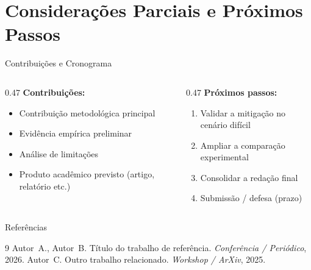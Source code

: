 \documentclass[aspectratio=169, 10pt, brazil]{beamer}
\begin{document}
\section{Considerações Parciais e Próximos Passos}

\begin{frame}{Contribuições e Cronograma}
  \begin{columns}[T]
    \begin{column}{0.47\textwidth}
      \textbf{Contribuições:}
      \begin{itemize}
        \item Contribuição metodológica principal
        \item Evidência empírica preliminar
        \item Análise de limitações
        \item Produto acadêmico previsto (artigo, relatório etc.)
      \end{itemize}
    \end{column}
    \begin{column}{0.47\textwidth}
      \textbf{Próximos passos:}
      \begin{enumerate}
        \item Validar a mitigação no cenário difícil
        \item Ampliar a comparação experimental
        \item Consolidar a redação final
        \item Submissão / defesa (prazo)
      \end{enumerate}
    \end{column}
  \end{columns}
\end{frame}

\begin{frame}[allowframebreaks]{Referências}
  \begin{thebibliography}{9}
      Autor~A., Autor~B.
      \newblock Título do trabalho de referência.
      \newblock \emph{Conferência / Periódico}, 2026.
      Autor~C.
      \newblock Outro trabalho relacionado.
      \newblock \emph{Workshop / ArXiv}, 2025.
  \end{thebibliography}
\end{frame}

\agradecimentos
\end{document}
